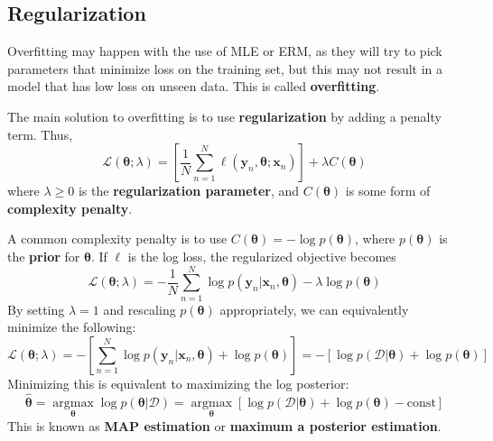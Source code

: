 \documentclass[11pt]{article}
\begin{document}
\subsection{Regularization}
Overfitting may happen with the use of MLE or ERM, as they will try to pick parameters that minimize loss on the training set, but this may not result in a model that has low loss on unseen data.
This is called \textbf{overfitting}.

The main solution to overfitting is to use \textbf{regularization} by adding a penalty term. Thus,
\[
\mathcal{L}(\boldsymbol{\theta}; \lambda) = \left[ \frac{1}{N} \sum_{n=1}^{N} \ell(\boldsymbol{y}_n, \boldsymbol{\theta}; \boldsymbol{x}_n) \right] + \lambda C(\boldsymbol{\theta})
\]
where $\lambda \geq 0$ is the \textbf{regularization parameter}, and $C(\boldsymbol{\theta})$ is some form of \textbf{complexity penalty}.

A common complexity penalty is to use $C(\boldsymbol{\theta}) = -\log p(\boldsymbol{\theta})$, where $p(\boldsymbol{\theta})$ is the \textbf{prior} for $\boldsymbol{\theta}$. If $\ell$ is the log loss, the regularized objective becomes
\[
\mathcal{L}(\boldsymbol{\theta}; \lambda) = -\frac{1}{N} \sum_{n=1}^{N} \log p(\boldsymbol{y}_n | \boldsymbol{x}_n, \boldsymbol{\theta}) - \lambda \log p(\boldsymbol{\theta})
\]
By setting $\lambda = 1$ and rescaling $p(\boldsymbol{\theta})$ appropriately, we can equivalently minimize the following:
\[
\mathcal{L}(\boldsymbol{\theta}; \lambda) = -\left[ \sum_{n=1}^{N} \log p(\boldsymbol{y}_n | \boldsymbol{x}_n, \boldsymbol{\theta}) + \log p(\boldsymbol{\theta}) \right] = -\left[ \log p(\mathcal{D} | \boldsymbol{\theta}) + \log p(\boldsymbol{\theta}) \right]
\]
Minimizing this is equivalent to maximizing the log posterior:
\[
\hat{\boldsymbol{\theta}} = \operatorname*{argmax}_{\boldsymbol{\theta}} \log p(\boldsymbol{\theta} | \mathcal{D}) = \operatorname*{argmax}_{\boldsymbol{\theta}} \left[ \log p(\mathcal{D} | \boldsymbol{\theta}) + \log p(\boldsymbol{\theta}) - \text{const} \right]
\]
This is known as \textbf{MAP estimation} or \textbf{maximum a posterior estimation}.
\end{document}
